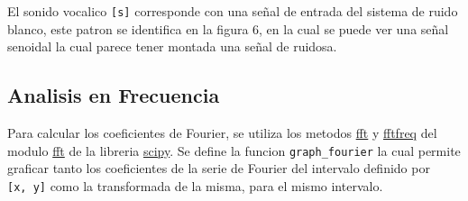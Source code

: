 \documentclass[11pt]{article}
\begin{document}
    El sonido vocalico \texttt{{[}s{]}} corresponde con una señal de entrada
del sistema de ruido blanco, este patron se identifica en la figura 6,
en la cual se puede ver una señal senoidal la cual parece tener montada
una señal de ruidosa.

    \hypertarget{analisis-en-frecuencia}{%
\subsection{Analisis en Frecuencia}\label{analisis-en-frecuencia}}

Para calcular los coeficientes de Fourier, se utiliza los metodos
\href{https://docs.scipy.org/doc/scipy/reference/generated/scipy.fft.fft.html\#scipy.fft.fft}{fft}
y
\href{https://docs.scipy.org/doc/scipy/reference/generated/scipy.fft.fftfreq.html\#fftfreq}{fftfreq}
del modulo
\href{https://docs.scipy.org/doc/scipy/reference/fft.html\#discrete-fourier-transforms-scipy-fft}{fft}
de la libreria
\href{https://docs.scipy.org/doc/scipy/index.html}{scipy}. Se define la
funcion \texttt{graph\_fourier} la cual permite graficar tanto los
coeficientes de la serie de Fourier del intervalo definido por
\texttt{{[}x,\ y{]}} como la transformada de la misma, para el mismo
intervalo.
\end{document}

